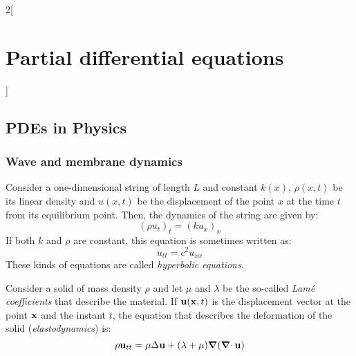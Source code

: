 \documentclass[../../../main_math.tex]{subfiles}
\begin{document}
\begin{multicols}{2}[\section{Partial differential equations}]
  \subsection{PDEs in Physics}
  \subsubsection{Wave and membrane dynamics}
  \begin{proposition}
    Consider a one-dimensional string of length $L$ and constant $k(x)$, $\rho(x,t)$ be its linear density and $u(x,t)$ be the displacement of the point $x$ at the time $t$ from its equilibrium point. Then, the dynamics of the string are given by: $${(\rho u_{t})}_t={(ku_x)}_x$$ If both $k$ and $\rho$ are constant, this equation is sometimes written as:
    \begin{equation}
      u_{tt}=c^2u_{xx}
    \end{equation}
    These kinds of equations are called \emph{hyperbolic equations}.
  \end{proposition}
  \begin{proposition}
    Consider a solid of mass density $\rho$ and let $\mu$ and $\lambda$ be the so-called \emph{Lamé coefficients} that describe the material. If $\boldsymbol{\mathrm{u}}(\boldsymbol{\mathrm{x}},t)$ is the displacement vector at the point $\boldsymbol{\mathrm{x}}$ and the instant $t$, the equation that describes the deformation of the solid (\emph{elastodynamics}) is:
    $$\rho\boldsymbol{\mathrm{u}}_{tt}=\mu\Delta\boldsymbol{\mathrm{u}}+(\lambda+\mu)\grad(\operatorname{\boldsymbol{\mathrm{\nabla}}\cdot}{\boldsymbol{\mathrm{u}}})$$
  \end{proposition}

\end{multicols}
\end{document}
